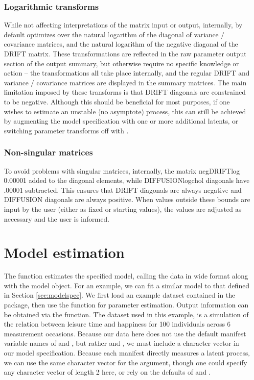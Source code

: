 \documentclass[nojss]{jss}\usepackage[]{graphicx}\usepackage[]{color}
\begin{document}
\subsubsection{Logarithmic transforms}\nopagebreak
While not affecting interpretations of the matrix input or output, internally, by default  optimizes over the natural logarithm of the diagonal of variance / covariance matrices, and the natural logarithm of the negative diagonal of the DRIFT matrix. These transformations are reflected in the raw  parameter output section of the output summary, but otherwise require no specific knowledge or action -- the transformations all take place internally, and the regular DRIFT and variance / covariance matrices are displayed in the summary matrices. The main limitation imposed by these transforms is that DRIFT diagonals are constrained to be negative. Although this should be beneficial for most purposes, if one wishes to estimate an unstable (no asymptote) process, this can still be achieved by augmenting the model specification with one or more additional latents, or switching parameter transforms off with .

\subsubsection{Non-singular matrices}\nopagebreak
To avoid problems with singular matrices, internally, the matrix negDRIFTlog 0.00001 added to the diagonal elements, while DIFFUSIONlogchol diagonals have .00001 subtracted. This ensures that DRIFT diagonals are always negative and DIFFUSION diagonals are always positive. When values outside these bounds are input by the user (either as fixed or starting values), the values are adjusted as necessary and the user is informed.

\section{Model estimation} \label{sec:modelfit}\nopagebreak
The  function estimates the specified model, calling the data in wide format along with the  model object. For an example, we can fit a similar model to that defined in Section \ref{sec:modelspec}. We first load an example dataset contained in the  package, then use the  function for parameter estimation. Output information can be obtained via the  function. The dataset used in this example, is a simulation of the relation between leisure time and happiness for 100 individuals across 6 measurement occasions.  Because our data here does not use the default manifest variable names of  and , but rather  and , we must include a  character vector in our model specification.  Because each manifest directly measures a latent process, we can use the same character vector for the  argument, though one could specify any character vector of length 2 here, or rely on the defaults of  and . 
\end{document}
